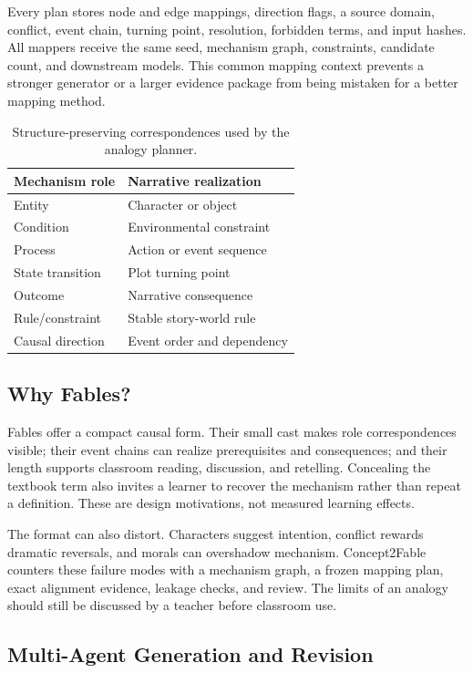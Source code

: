 \documentclass[letterpaper]{article} %
\begin{document}
Every plan stores node and edge mappings, direction flags, a source domain, conflict, event chain, turning point, resolution, forbidden terms, and input hashes. All mappers receive the same seed, mechanism graph, constraints, candidate count, and downstream models. This common mapping context prevents a stronger generator or a larger evidence package from being mistaken for a better mapping method.

\begin{table}[t]
\centering
\small
\begin{tabular}{ll}
\toprule
Mechanism role & Narrative realization \\
\midrule
Entity & Character or object \\
Condition & Environmental constraint \\
Process & Action or event sequence \\
State transition & Plot turning point \\
Outcome & Narrative consequence \\
Rule/constraint & Stable story-world rule \\
Causal direction & Event order and dependency \\
\bottomrule
\end{tabular}
\caption{Structure-preserving correspondences used by the analogy planner.}
\label{tab:correspondence}
\end{table}

\subsection{Why Fables?}

Fables offer a compact causal form. Their small cast makes role correspondences visible; their event chains can realize prerequisites and consequences; and their length supports classroom reading, discussion, and retelling. Concealing the textbook term also invites a learner to recover the mechanism rather than repeat a definition. These are design motivations, not measured learning effects.

The format can also distort. Characters suggest intention, conflict rewards dramatic reversals, and morals can overshadow mechanism. Concept2Fable counters these failure modes with a mechanism graph, a frozen mapping plan, exact alignment evidence, leakage checks, and review. The limits of an analogy should still be discussed by a teacher before classroom use.

\subsection{Multi-Agent Generation and Revision}
\end{document}
